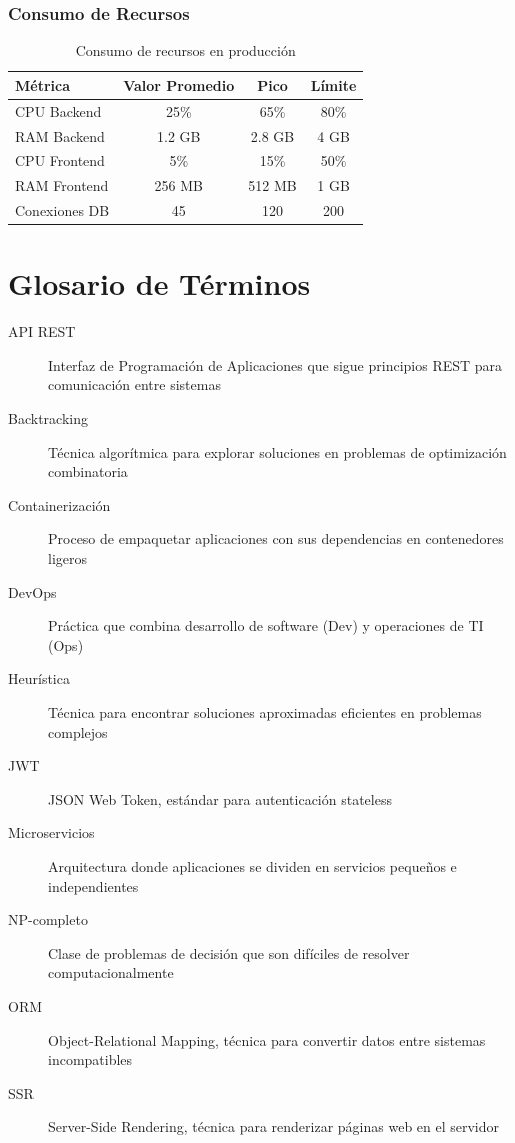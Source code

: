 \subsubsection{Consumo de Recursos}

\begin{table}[h]
\centering
\caption{Consumo de recursos en producción}
\label{tab:consumo_recursos}
\begin{tabular}{|l|c|c|c|}
\hline
\textbf{Métrica} & \textbf{Valor Promedio} & \textbf{Pico} & \textbf{Límite} \\
\hline
CPU Backend & 25\% & 65\% & 80\% \\
\hline
RAM Backend & 1.2 GB & 2.8 GB & 4 GB \\
\hline
CPU Frontend & 5\% & 15\% & 50\% \\
\hline
RAM Frontend & 256 MB & 512 MB & 1 GB \\
\hline
Conexiones DB & 45 & 120 & 200 \\
\hline
\end{tabular}
\end{table}

\section{Glosario de Términos}

\begin{description}
\item[API REST] Interfaz de Programación de Aplicaciones que sigue principios REST para comunicación entre sistemas
\item[Backtracking] Técnica algorítmica para explorar soluciones en problemas de optimización combinatoria
\item[Containerización] Proceso de empaquetar aplicaciones con sus dependencias en contenedores ligeros
\item[DevOps] Práctica que combina desarrollo de software (Dev) y operaciones de TI (Ops)
\item[Heurística] Técnica para encontrar soluciones aproximadas eficientes en problemas complejos
\item[JWT] JSON Web Token, estándar para autenticación stateless
\item[Microservicios] Arquitectura donde aplicaciones se dividen en servicios pequeños e independientes
\item[NP-completo] Clase de problemas de decisión que son difíciles de resolver computacionalmente
\item[ORM] Object-Relational Mapping, técnica para convertir datos entre sistemas incompatibles
\item[SSR] Server-Side Rendering, técnica para renderizar páginas web en el servidor
\end{description}


